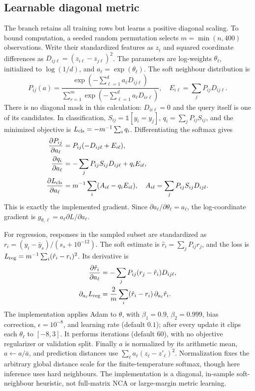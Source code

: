 \documentclass[conference]{IEEEtran}
\begin{document}
\subsection{Learnable diagonal metric}
\label{sec:metric}
The  branch retains all training rows but learns a positive diagonal scaling. To bound computation, a seeded random permutation selects $m=\min(n,400)$ observations. Write their standardized features as $z_i$ and squared coordinate differences as $D_{ij\ell}=(z_{i\ell}-z_{j\ell})^2$. The parameters are log-weights $\theta_\ell$, initialized to $\log(1/d)$, and $a_\ell=\exp(\theta_\ell)$. The soft neighbour distribution is
\begin{equation}
 P_{ij}(a)=\frac{\exp(-\sum_{\ell=1}^d a_\ell D_{ij\ell})}{\sum_{r=1}^{m}\exp(-\sum_{\ell=1}^d a_\ell D_{ir\ell})},\quad
 E_{i\ell}=\sum_jP_{ij}D_{ij\ell}.
 \label{eq:soft}
\end{equation}
There is no diagonal mask in this calculation: $D_{ii\ell}=0$ and the query itself is one of its candidates. In classification, $S_{ij}=\mathbb{1}[y_i=y_j]$, $q_i=\sum_jP_{ij}S_{ij}$, and the minimized objective is $L_{\rm cls}=-m^{-1}\sum_iq_i$. Differentiating the softmax gives
\begin{align}
 \frac{\partial P_{ij}}{\partial a_\ell}&=P_{ij}(-D_{ij\ell}+E_{i\ell}),\\
 \frac{\partial q_i}{\partial a_\ell}&=-\sum_jP_{ij}S_{ij}D_{ij\ell}+q_iE_{i\ell},\\
 \frac{\partial L_{\rm cls}}{\partial a_\ell}&=m^{-1}\sum_i(A_{i\ell}-q_iE_{i\ell}),\quad A_{i\ell}=\sum_jP_{ij}S_{ij}D_{ij\ell}.
 \label{eq:clsgrad}
\end{align}
This is exactly the implemented gradient. Since $\partial a_\ell/\partial\theta_\ell=a_\ell$, the log-coordinate gradient is $g_{\theta,\ell}=a_\ell\partial L/\partial a_\ell$.

For regression, responses in the sampled subset are standardized as $r_i=(y_i-\bar y_s)/(s_s+10^{-12})$. The soft estimate is $\hat r_i=\sum_jP_{ij}r_j$, and the loss is $L_{\rm reg}=m^{-1}\sum_i(\hat r_i-r_i)^2$. Its derivative is
\begin{align}
 \frac{\partial\hat r_i}{\partial a_\ell}&=-\sum_jP_{ij}(r_j-\hat r_i)D_{ij\ell},\\
 \partial_{a_\ell}L_{\rm reg}&=\frac{2}{m}\sum_i(\hat r_i-r_i)\,\partial_{a_\ell}\hat r_i.
 \label{eq:reggrad}
\end{align}
The implementation applies Adam to $\theta$, with $\beta_1=0.9$, $\beta_2=0.999$, bias correction, $\epsilon=10^{-8}$, and learning rate  (default $0.1$); after every update it clips each $\theta_\ell$ to $[-8,3]$. It performs  iterations (default $60$), with no objective regularizer or validation split. Finally $a$ is normalized by its arithmetic mean, $a\leftarrow a/\bar a$, and prediction distances use $\sum_\ell a_\ell(z_\ell-z'_\ell)^2$. Normalization fixes the arbitrary global distance scale for the finite-temperature softmax, though here inference uses hard neighbours. The implementation is a diagonal, in-sample soft-neighbour heuristic, not full-matrix NCA or large-margin metric learning.
\end{document}
